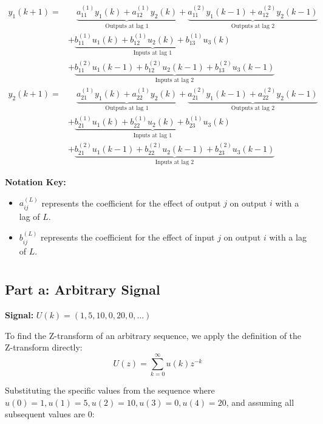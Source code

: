 \documentclass[a4paper,12pt]{article}
\begin{document}
\begin{align*}
    y_1(k+1) = & \quad \underbrace{a_{11}^{(1)}y_1(k) + a_{12}^{(1)}y_2(k)}_{\text{Outputs at lag 1}} 
               + \underbrace{a_{11}^{(2)}y_1(k-1) + a_{12}^{(2)}y_2(k-1)}_{\text{Outputs at lag 2}} \\
               & + \underbrace{b_{11}^{(1)}u_1(k) + b_{12}^{(1)}u_2(k) + b_{13}^{(1)}u_3(k)}_{\text{Inputs at lag 1}} \\
               & + \underbrace{b_{11}^{(2)}u_1(k-1) + b_{12}^{(2)}u_2(k-1) + b_{13}^{(2)}u_3(k-1)}_{\text{Inputs at lag 2}} \\[1em]
    y_2(k+1) = & \quad \underbrace{a_{21}^{(1)}y_1(k) + a_{22}^{(1)}y_2(k)}_{\text{Outputs at lag 1}} 
               + \underbrace{a_{21}^{(2)}y_1(k-1) + a_{22}^{(2)}y_2(k-1)}_{\text{Outputs at lag 2}} \\
               & + \underbrace{b_{21}^{(1)}u_1(k) + b_{22}^{(1)}u_2(k) + b_{23}^{(1)}u_3(k)}_{\text{Inputs at lag 1}} \\
               & + \underbrace{b_{21}^{(2)}u_1(k-1) + b_{22}^{(2)}u_2(k-1) + b_{23}^{(2)}u_3(k-1)}_{\text{Inputs at lag 2}}
\end{align*}

\textbf{Notation Key:}
\begin{itemize}
    \item $a_{ij}^{(L)}$ represents the coefficient for the effect of output $j$ on output $i$ with a lag of $L$.
    \item $b_{ij}^{(L)}$ represents the coefficient for the effect of input $j$ on output $i$ with a lag of $L$.
\end{itemize}

\section{}

\subsection{Part a: Arbitrary Signal}
\textbf{Signal:} $U(k) = (1, 5, 10, 0, 20, 0, \dots)$

To find the Z-transform of an arbitrary sequence, we apply the definition of the Z-transform directly:
$$ U(z) = \sum_{k=0}^{\infty} u(k) z^{-k} $$

Substituting the specific values from the sequence where $u(0)=1, u(1)=5, u(2)=10, u(3)=0, u(4)=20$, and assuming all subsequent values are 0:
\end{document}

